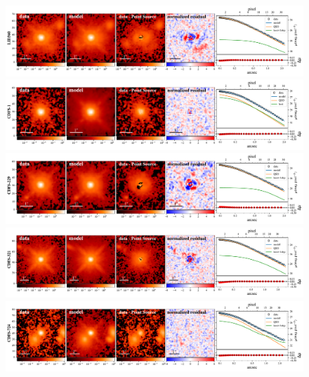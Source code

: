 \documentclass[apj]{emulateapj}
\begin{document}
\begin{figure}
\centering
{
\includegraphics[height=0.25\textwidth]{fig/best_fit_LID360_SB_profile.pdf}
\includegraphics[height=0.25\textwidth]{fig/best_fit_CDFS-1_SB_profile.pdf}
\includegraphics[height=0.25\textwidth]{fig/best_fit_CDFS-229_SB_profile.pdf}
\includegraphics[height=0.25\textwidth]{fig/best_fit_CDFS-321_SB_profile.pdf}
\includegraphics[height=0.25\textwidth]{fig/best_fit_CDFS-724_SB_profile.pdf}
}
\end{figure} 
\end{document}
